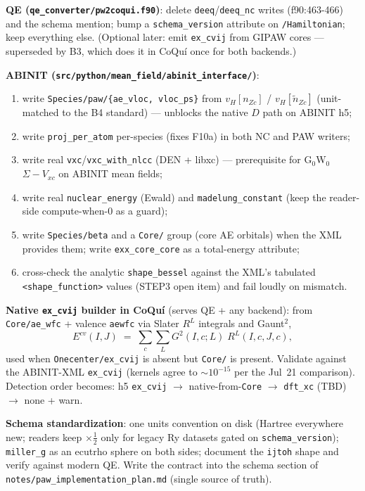 \documentclass[11pt]{article}
\newcommand{\code}[1]{\texttt{\small #1}}
\newcommand{\file}[1]{\texttt{\small #1}}
\begin{document}
\begin{description}[leftmargin=2.6em,style=nextline]
\item[B1.] \textbf{QE (\file{qe\_converter/pw2coqui.f90})}: delete
\code{deeq}/\code{deeq\_nc} writes (f90:463-466) and the schema mention;
bump a \code{schema\_version} attribute on \code{/Hamiltonian}; keep
everything else. (Optional later: emit \code{ex\_cvij} from GIPAW cores ---
superseded by B3, which does it in CoQu\'i once for both backends.)

\item[B2.] \textbf{ABINIT
(\file{src/python/mean\_field/abinit\_interface/})}:
\begin{enumerate}[leftmargin=1.8em]
\item write \code{Species/paw/\{ae\_vloc, vloc\_ps\}} from $v_H[n_{Zc}]$ /
$v_H[\tilde n_{Zc}]$ (unit-matched to the B4 standard) --- unblocks the
native $D$ path on ABINIT h5;
\item write \code{proj\_per\_atom} per-species (fixes F10a) in both NC and
PAW writers;
\item write real \code{vxc}/\code{vxc\_with\_nlcc} (DEN + libxc) ---
prerequisite for G$_0$W$_0$ $\Sigma - V_{xc}$ on ABINIT mean fields;
\item write real \code{nuclear\_energy} (Ewald) and
\code{madelung\_constant} (keep the reader-side compute-when-0 as a guard);
\item write \code{Species/beta} and a \code{Core/} group (core AE orbitals)
when the XML provides them; write \code{exx\_core\_core} as a total-energy
attribute;
\item cross-check the analytic \code{shape\_bessel} against the XML's
tabulated \code{<shape\_function>} values (STEP3 open item) and fail loudly
on mismatch.
\end{enumerate}

\item[B3.] \textbf{Native \code{ex\_cvij} builder in CoQu\'i} (serves QE +
any backend): from \code{Core/ae\_wfc} + valence \code{aewfc} via Slater
$R^L$ integrals and Gaunt$^2$,
\begin{equation}
E^{cv}(I,J) \;=\; \sum_{c}\sum_{L} G^2(I,c;L)\; R^L(I,c,J,c),
\end{equation}
used when \code{Onecenter/ex\_cvij} is absent but \code{Core/} is present.
Validate against the ABINIT-XML \code{ex\_cvij} (kernels agree to
${\sim}10^{-15}$ per the Jul~21 comparison). Detection order becomes: h5
\code{ex\_cvij} $\to$ native-from-\code{Core} $\to$ \code{dft\_xc} (TBD)
$\to$ none + warn.

\item[B4.] \textbf{Schema standardization}: one units convention on disk
(Hartree everywhere new; readers keep $\times\tfrac12$ only for legacy Ry
datasets gated on \code{schema\_version}); \code{miller\_g} as an ecutrho
sphere on both sides; document the \code{ijtoh} shape and verify against
modern QE. Write the contract into the schema section of
\file{notes/paw\_implementation\_plan.md} (single source of truth).
\end{description}
\end{document}
